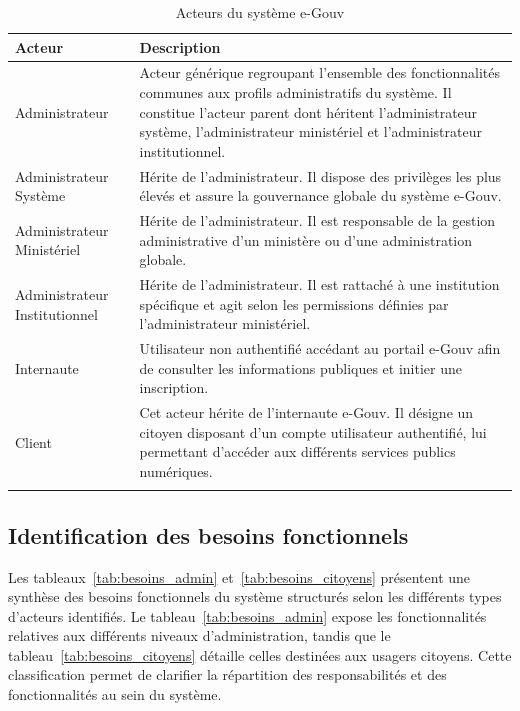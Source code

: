 \begin{longtable}{|p{6cm}|p{9cm}|}
\hline
\rowcolor{gray!30}
\textbf{Acteur} & \textbf{Description} \\ \hline
\endfirsthead

 
Administrateur &
Acteur générique regroupant l’ensemble des fonctionnalités communes aux profils administratifs du système.
Il constitue l’acteur parent dont héritent l’administrateur système, l’administrateur ministériel et l’administrateur institutionnel. \\ \hline

Administrateur Système &
Hérite de l’administrateur. Il dispose des privilèges les plus élevés et assure la gouvernance globale du système e-Gouv. \\ \hline

Administrateur Ministériel &
Hérite de l’administrateur. Il est responsable de la gestion administrative d’un ministère ou d’une administration globale. \\ \hline

Administrateur Institutionnel &
Hérite de l’administrateur. Il est rattaché à une institution spécifique et agit selon les permissions définies par l’administrateur ministériel. \\ \hline

Internaute &
Utilisateur non authentifié accédant au portail e-Gouv afin de consulter les informations publiques et initier une inscription. \\ \hline

Client &
Cet acteur hérite de l’internaute e-Gouv. Il désigne un citoyen disposant d’un compte utilisateur authentifié, lui permettant d’accéder aux différents services publics numériques. \\ \hline

\rowcolor{white}
\caption{Acteurs du système e-Gouv}
\label{tab:acteurs}
\end{longtable}

 
\subsection{Identification des besoins fonctionnels}


Les tableaux~\ref{tab:besoins_admin} et~\ref{tab:besoins_citoyens} présentent une synthèse des besoins fonctionnels du système structurés selon les différents types d’acteurs identifiés. Le tableau~\ref{tab:besoins_admin} expose les fonctionnalités relatives aux différents niveaux d’administration, tandis que le tableau~\ref{tab:besoins_citoyens} détaille celles destinées aux usagers citoyens. Cette classification permet de clarifier la répartition des responsabilités et des fonctionnalités au sein du système.




